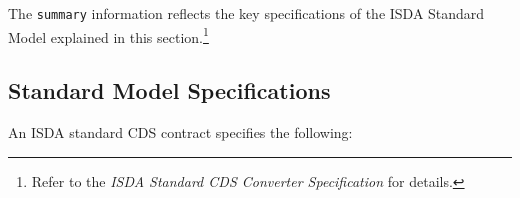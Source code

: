 \documentclass[a4paper]{article}
\begin{document}

The \texttt{summary} information reflects the key specifications of
the ISDA Standard Model explained in this section.\footnote{Refer to
  the \textit{ISDA Standard CDS Converter Specification} for details.}


\subsection{Standard Model Specifications}
An ISDA standard CDS contract specifies the following:
\end{document}
